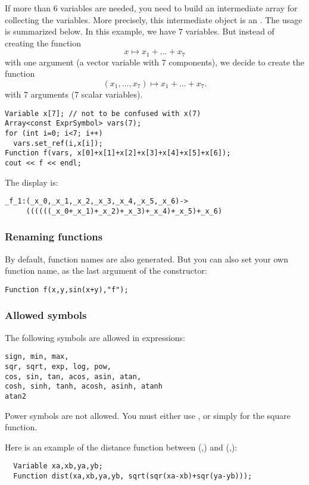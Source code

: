If more than 6 variables are needed, you need to build an intermediate array for collecting the variables.
More precisely, this intermediate object is an . The usage is summarized below. In this
example, we have 7 variables. But instead of creating the function
$$x\mapsto x_1+\ldots+x_7$$
with one argument (a vector variable with 7 components), we decide to create the function
$$(x_1,\ldots,x_7)\mapsto x_1+\ldots+x_7.$$
with 7 arguments (7 scalar variables).
\begin{lstlisting}
Variable x[7]; // not to be confused with x(7)
Array<const ExprSymbol> vars(7);
for (int i=0; i<7; i++)
  vars.set_ref(i,x[i]);
Function f(vars, x[0]+x[1]+x[2]+x[3]+x[4]+x[5]+x[6]);
cout << f << endl;
\end{lstlisting}	

The display is:
\begin{verbatim}
_f_1:(_x_0,_x_1,_x_2,_x_3,_x_4,_x_5,_x_6)->
     ((((((_x_0+_x_1)+_x_2)+_x_3)+_x_4)+_x_5)+_x_6)
\end{verbatim}

\subsubsection{Renaming functions}

By default, function names are also generated. But you can also set your own function name, as the last argument of the constructor:
\begin{lstlisting}
Function f(x,y,sin(x+y),"f");
\end{lstlisting}

\subsubsection{Allowed symbols}

The following symbols are allowed in expressions:
\begin{verbatim}
sign, min, max,
sqr, sqrt, exp, log, pow, 
cos, sin, tan, acos, asin, atan,
cosh, sinh, tanh, acosh, asinh, atanh
atan2
\end{verbatim}

Power symbols \cf{^} are not allowed. You must
either use , or simply  for the square function.

Here is an example of the distance function between (,) and
(,):

\begin{lstlisting}
  Variable xa,xb,ya,yb;
  Function dist(xa,xb,ya,yb, sqrt(sqr(xa-xb)+sqr(ya-yb)));
\end{lstlisting}

